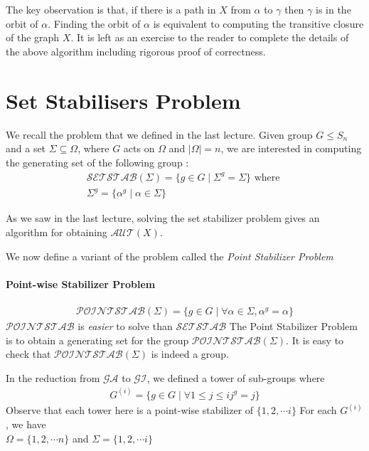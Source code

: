 The key observation is that, if there is a path in $X$ from $\alpha$ to $\gamma$ then $\gamma$ is in the orbit of $\alpha$.
Finding the orbit of $\alpha$ is equivalent to computing the 
transitive closure of the graph $X$. It is left as an exercise to the reader to complete the details of the above algorithm including rigorous proof of correctness.

\section{Set Stabilisers Problem}

We recall the problem that we defined in the last lecture. Given group $G \leq S_n$ and a set $\Sigma \subseteq \Omega$, where $G$ acts on $\Omega$ and $|\Omega| = n$, we are interested in computing the generating set of the following group :
\begin{align}
\mathcal{SETSTAB} (\Sigma) = \lbrace g \in G \mid \Sigma^g = \Sigma \rbrace \text{ where }\\
\Sigma^g = \lbrace \alpha^g \mid \alpha \in \Sigma \rbrace 
\end{align}

As we saw in the last lecture, solving the set stabilizer problem gives an algorithm for obtaining $\mathcal{AUT}(X)$.

We now define a variant of the problem called the \textit{Point Stabilizer Problem}

\paragraph{Point-wise Stabilizer Problem}
\begin{align}
\mathcal{POINTSTAB} (\Sigma) = \lbrace g \in G \mid \forall \alpha \in \Sigma, \alpha^g = \alpha \rbrace
\end{align}
$\mathcal{POINTSTAB}$ is \emph{easier} to solve than $\mathcal{SETSTAB}$
The Point Stabilizer Problem is to obtain a generating set for the
group $\mathcal{POINTSTAB} (\Sigma)$. It is easy to check that $\mathcal{POINTSTAB} (\Sigma)$ is indeed a group.

In the reduction from $\mathcal{GA}$ to $\mathcal{GI}$, we defined
a tower of sub-groups  where
\begin{align}
G^{(i)} = \lbrace g \in G \mid \forall 1 \leq j \leq i j^g = j \rbrace 
\end{align}
Observe that each tower here is a point-wise stabilizer of $\lbrace 1, 2, \cdots i \rbrace$
For each $G^{(i)}$, we have \\
$\Omega = \lbrace 1, 2, \cdots n \rbrace$  and $\Sigma = \lbrace 1, 2, \cdots i \rbrace$ 

